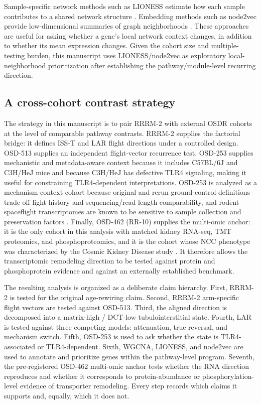 \documentclass[11pt]{article}
\begin{document}
Sample-specific network methods such as LIONESS estimate how each sample contributes to a shared network structure \citep{kuijjer2019estimating}. Embedding methods such as node2vec provide low-dimensional summaries of graph neighborhoods \citep{grover2016node2vec}. These approaches are useful for asking whether a gene's local network context changes, in addition to whether its mean expression changes. Given the cohort size and multiple-testing burden, this manuscript uses LIONESS/node2vec as exploratory local-neighborhood prioritization after establishing the pathway/module-level recurring direction.

\subsection{A cross-cohort contrast strategy}

The strategy in this manuscript is to pair RRRM-2 with external OSDR cohorts at the level of comparable pathway contrasts. RRRM-2 supplies the factorial bridge: it defines ISS-T and LAR flight directions under a controlled design. OSD-513 supplies an independent flight-vector recurrence test. OSD-253 supplies mechanistic and metadata-aware context because it includes C57BL/6J and C3H/HeJ mice and because C3H/HeJ has defective TLR4 signaling, making it useful for constraining TLR4-dependent interpretations. OSD-253 is analyzed as a mechanism-context cohort because original and rerun ground-control definitions trade off light history and sequencing/read-length comparability, and rodent spaceflight transcriptomes are known to be sensitive to sample collection and preservation factors \citep{galazka2020rnaseq,preserve2016}. Finally, OSD-462 (RR-10) supplies the multi-omic anchor: it is the only cohort in this analysis with matched kidney RNA-seq, TMT proteomics, and phosphoproteomics, and it is the cohort whose NCC phenotype was characterized by the Cosmic Kidney Disease study \citep{siew2024cosmic}. It therefore allows the transcriptomic remodeling direction to be tested against protein and phosphoprotein evidence and against an externally established benchmark.

The resulting analysis is organized as a deliberate claim hierarchy. First, RRRM-2 is tested for the original age-rewiring claim. Second, RRRM-2 arm-specific flight vectors are tested against OSD-513. Third, the aligned direction is decomposed into a matrix-high / DCT-low tubulointerstitial state. Fourth, LAR is tested against three competing models: attenuation, true reversal, and mechanism switch. Fifth, OSD-253 is used to ask whether the state is TLR4-associated or TLR4-dependent. Sixth, WGCNA, LIONESS, and node2vec are used to annotate and prioritize genes within the pathway-level program. Seventh, the pre-registered OSD-462 multi-omic anchor tests whether the RNA direction reproduces and whether it corresponds to protein-abundance or phosphorylation-level evidence of transporter remodeling. Every step records which claims it supports and, equally, which it does not.
\end{document}
